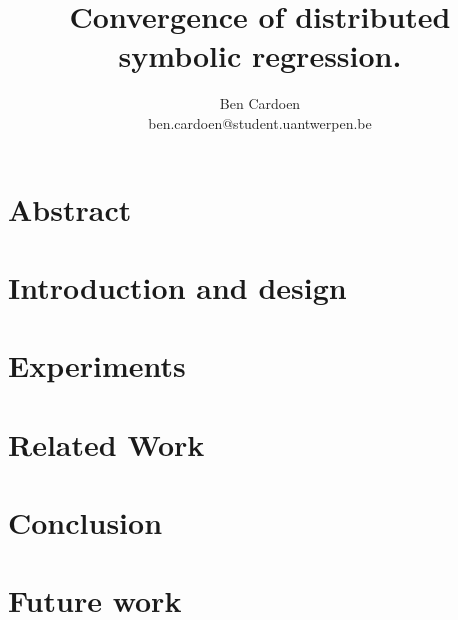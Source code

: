\documentclass[]{article}
\title{Convergence of distributed symbolic regression.
    }
\author{
    Ben Cardoen  \\
    ben.cardoen@student.uantwerpen.be
}
\begin{document}
    
    \maketitle
    \section{Abstract}
    
    \section{Introduction and design}
    
    \section{Experiments}
    
    \section{Related Work}
    
    \section{Conclusion}
    
    \section{Future work}
    
    
    
    
\end{document}
